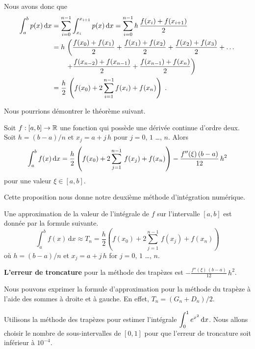 {Nous avons donc que
\begin{align*}
\int_a^b p(x) \,\mathrm{d}x &= \sum_{i=0}^{n-1} \int_{x_i}^{x_{i+1}}p(x)  \,\mathrm{d}x
= \sum_{i=0}^{n-1} h \,\frac{f(x_{i})+f(x_{i+1})}{2} \\
&= h\,\left( \frac{f(x_0)+f(x_1)}{2}
+\frac{f(x_1)+f(x_2)}{2} + \frac{f(x_2)+f(x_3)}{2} + \ldots \right. \\
&\qquad \left. +\frac{f(x_{n-2})+f(x_{n-1})}{2} +\frac{f(x_{n-1})+f(x_n)}{2}
 \right) \\
&=\frac{h}{2}\,\left( f(x_0) + 2 \sum_{i=1}^{n-1} f(x_i) + f(x_n) \right) \; .
\end{align*}

Nous pourrions démontrer le théorème suivant.

\begin{focus}{\prp}
Soit $f:[a,b]\rightarrow \mathbb{R}$ une fonction qui possède une dérivée
continue d'ordre deux.  Soit $h=(b-a)/n$ et $x_j = a+j\,h$ pour $j=0$,
$1$ \ldots, $n$.  Alors
\[
\int_{a}^{b} f(x)\,\mathrm{d}x = \frac{h}{2} \left( f(x_0) + 2\sum_{j=1}^{n-1}\,f(x_j)
+ f(x_n) \right) - \frac{f''(\xi)\,(b-a)}{12}\,h^2
\]
pour une valeur $\xi \in [a,b]$.
\end{focus}

Cette proposition nous donne notre deuxième méthode d'intégration
numérique.

\begin{focus}{\mth}
Une approximation de la valeur de l'intégrale de $f$ sur l'intervalle
$[a,b]$ est donnée par la formule suivante.
\[
\int_{a}^{b} f(x)\,\text{d}x \approx T_n =
\frac{h}{2} \left( f(x_0) + 2 \sum_{j=1}^{n-1}\,f(x_j) + f(x_n) \right)
\]
où $h=(b-a)/n$ et $x_j = a+j\,h$ for $j=0$, $1$ \ldots, $n$.

{\bfseries L'erreur de troncature}
pour la méthode des trapèzes est
$\displaystyle - \frac{f''(\xi)\,(b-a)}{12}\,h^2$.
\label{CTR}
\end{focus}

\begin{rmk}
Nous pouvons exprimer la formule d'approximation pour la méthode du trapèze
à l'aide des sommes à droite et à gauche.  En effet, $T_n = ( G_n + D_n)/2$.
\end{rmk}

\begin{egg}
Utilisons la méthode des trapèzes pour estimer l'intégrale
$\displaystyle \int_0^1 e^{x^2}\,\mathrm{d}x$.  Nous allons choisir le nombre de
sous-intervalles de $[0,1]$ pour que l'erreur de troncature soit
inférieur à $10^{-4}$.


\end{egg}}
